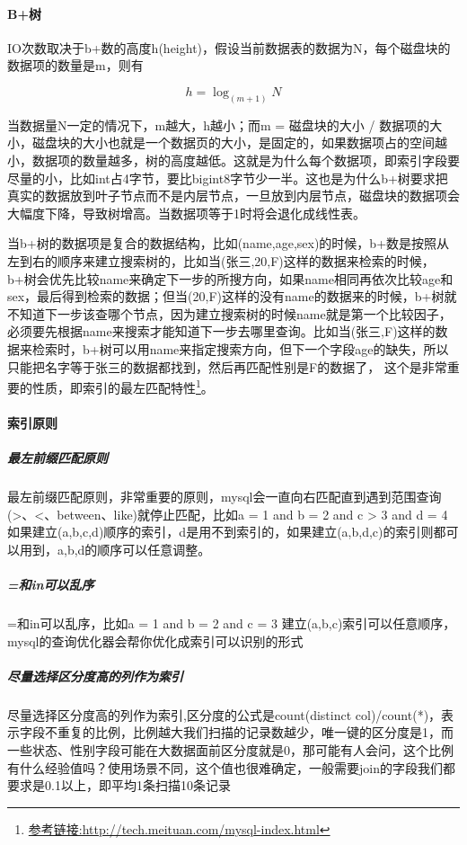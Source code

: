 \documentclass[letter]{book}
\begin{document}
\paragraph{B+树}

IO次数取决于b+数的高度h(height)，假设当前数据表的数据为N，每个磁盘块的数据项的数量是m，则有

\begin{equation}
h=\log_{(m+1)} N
\end{equation}


当数据量N一定的情况下，m越大，h越小；而m = 磁盘块的大小 / 数据项的大小，磁盘块的大小也就是一个数据页的大小，是固定的，如果数据项占的空间越小，数据项的数量越多，树的高度越低。这就是为什么每个数据项，即索引字段要尽量的小，比如int占4字节，要比bigint8字节少一半。这也是为什么b+树要求把真实的数据放到叶子节点而不是内层节点，一旦放到内层节点，磁盘块的数据项会大幅度下降，导致树增高。当数据项等于1时将会退化成线性表。

当b+树的数据项是复合的数据结构，比如(name,age,sex)的时候，b+数是按照从左到右的顺序来建立搜索树的，比如当(张三,20,F)这样的数据来检索的时候，b+树会优先比较name来确定下一步的所搜方向，如果name相同再依次比较age和sex，最后得到检索的数据；但当(20,F)这样的没有name的数据来的时候，b+树就不知道下一步该查哪个节点，因为建立搜索树的时候name就是第一个比较因子，必须要先根据name来搜索才能知道下一步去哪里查询。比如当(张三,F)这样的数据来检索时，b+树可以用name来指定搜索方向，但下一个字段age的缺失，所以只能把名字等于张三的数据都找到，然后再匹配性别是F的数据了， 这个是非常重要的性质，即索引的最左匹配特性\footnote{\url{参考链接:http://tech.meituan.com/mysql-index.html}}。

\paragraph{索引原则}

\subparagraph{最左前缀匹配原则}最左前缀匹配原则，非常重要的原则，mysql会一直向右匹配直到遇到范围查询(>、<、between、like)就停止匹配，比如a = 1 and b = 2 and c > 3 and d = 4 如果建立(a,b,c,d)顺序的索引，d是用不到索引的，如果建立(a,b,d,c)的索引则都可以用到，a,b,d的顺序可以任意调整。

\subparagraph{=和in可以乱序}=和in可以乱序，比如a = 1 and b = 2 and c = 3 建立(a,b,c)索引可以任意顺序，mysql的查询优化器会帮你优化成索引可以识别的形式

\subparagraph{尽量选择区分度高的列作为索引}尽量选择区分度高的列作为索引,区分度的公式是count(distinct col)/count(*)，表示字段不重复的比例，比例越大我们扫描的记录数越少，唯一键的区分度是1，而一些状态、性别字段可能在大数据面前区分度就是0，那可能有人会问，这个比例有什么经验值吗？使用场景不同，这个值也很难确定，一般需要join的字段我们都要求是0.1以上，即平均1条扫描10条记录
\end{document}
